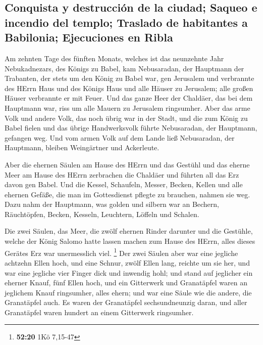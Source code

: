 \hypertarget{conquista-y-destrucciuxf3n-de-la-ciudad-saqueo-e-incendio-del-templo-traslado-de-habitantes-a-babilonia-ejecuciones-en-ribla}{%
\subsection{Conquista y destrucción de la ciudad; Saqueo e incendio del
templo; Traslado de habitantes a Babilonia; Ejecuciones en
Ribla}\label{conquista-y-destrucciuxf3n-de-la-ciudad-saqueo-e-incendio-del-templo-traslado-de-habitantes-a-babilonia-ejecuciones-en-ribla}}

 Am zehnten Tage des fünften Monats, welches ist das
neunzehnte Jahr Nebukadnezars, des Königs zu Babel, kam Nebusaradan, der
Hauptmann der Trabanten, der stets um den König zu Babel war, gen
Jerusalem  und verbrannte des HErrn Haus und des Königs
Haus und alle Häuser zu Jerusalem; alle großen Häuser verbrannte er mit
Feuer.  Und das ganze Heer der Chaldäer, das bei dem
Hauptmann war, riss um alle Mauern zu Jerusalem ringsumher.
 Aber das arme Volk und andere Volk, das noch übrig war
in der Stadt, und die zum König zu Babel fielen und das übrige
Handwerksvolk führte Nebusaradan, der Hauptmann, gefangen weg.
 Und vom armen Volk auf dem Lande ließ Nebusaradan, der
Hauptmann, bleiben Weingärtner und Ackerleute.

 Aber die ehernen Säulen am Hause des HErrn und das
Gestühl und das eherne Meer am Hause des HErrn zerbrachen die Chaldäer
und führten all das Erz davon gen Babel.  Und die Kessel,
Schaufeln, Messer, Becken, Kellen und alle ehernen Gefäße, die man im
Gottesdienst pflegte zu brauchen, nahmen sie weg.  Dazu
nahm der Hauptmann, was golden und silbern war an Bechern, Räuchtöpfen,
Becken, Kesseln, Leuchtern, Löffeln und Schalen.

 Die zwei Säulen, das Meer, die zwölf ehernen Rinder
darunter und die Gestühle, welche der König Salomo hatte lassen machen
zum Hause des HErrn, alles dieses Gerätes Erz war unermesslich viel.
\footnote{\textbf{52:20} 1Kö 7,15-47}  Der zwei Säulen
aber war eine jegliche achtzehn Ellen hoch, und eine Schnur, zwölf Ellen
lang, reichte um sie her, und war eine jegliche vier Finger dick und
inwendig hohl;  und stand auf jeglicher ein eherner
Knauf, fünf Ellen hoch, und ein Gitterwerk und Granatäpfel waren an
jeglichem Knauf ringsumher, alles ehern; und war eine Säule wie die
andere, die Granatäpfel auch.  Es waren der Granatäpfel
sechsundneunzig daran, und aller Granatäpfel waren hundert an einem
Gitterwerk ringsumher.

